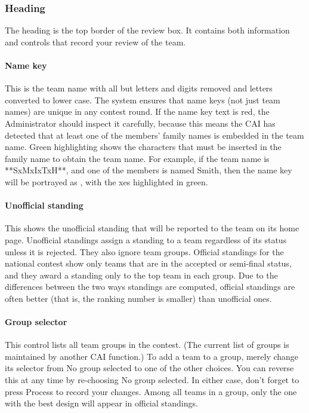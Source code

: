 \documentclass[11pt,letterpaper]{refart}
\def\ui#1{\textsf{#1}}
\begin{document}
\subsubsection{Heading}
\label{sec:heading}
The heading is the top border of the review box. It contains both information
and controls that record your review of the team. 

\paragraph{Name key}
This is the team name
with all but letters and digits removed and letters converted to lower case. The
system ensures that name keys (not just team names) are unique in any contest 
round. If the name key text is red, the Administrator
should inspect it carefully, because this means the CAI has detected that at
least one of the members' family names is embedded in the team name. Green
highlighting shows the characters that must be inserted in the family name to
obtain the team name. For example, if the team name is \ui{**SxMxIxTxH**}, and
one of the members is named Smith, then the name key will be portrayed as
\ui{\color{red}{sxmxixtxh}}, with the \ui{x}es highlighted in green.

\paragraph{Unofficial standing}
This shows the unofficial standing that will be reported to the team on its home
page. Unofficial standings assign a standing to a team regardless of its status 
unless it is rejected. They also ignore team groups. Official standings for 
the national contest show only teams
that are in the accepted or semi-final status, and they award a standing only to
the top team in each group. Due to the differences between the two ways 
standings are computed, official standings are often better (that is, the ranking 
number is smaller) than unofficial ones.

\paragraph{Group selector}
This control lists all team groups in the contest. (The current list
of groups is maintained by another CAI function.)
To add a team to a group, merely 
change its selector from \ui{No group selected} to one of the other choices. You 
can reverse this at any time by re-choosing \ui{No group selected}. In either case,
don't forget to press \ui{Process} to record your changes. Among all teams
in a group, only the one with the best design will appear in official standings.
\end{document}
